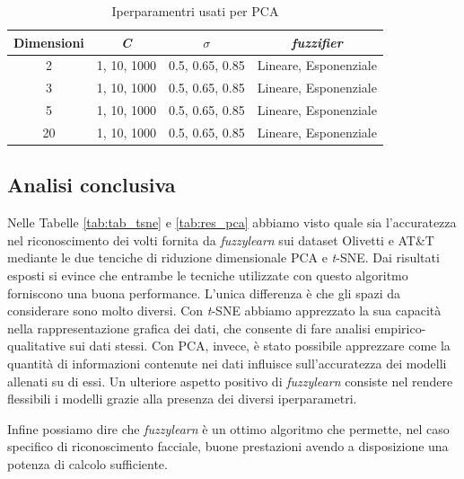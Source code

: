 \documentclass[12pt,italian]{report}
\begin{document}
\begin{table}[h!]
	\begin{center}
		\begin{tabular}{c|c|c|c}
			\toprule
			Dimensioni & \emph{C}           & $ \sigma $       & \emph{fuzzifier}             \\ \midrule
			2 & 1, 10, 1000 & 0.5, 0.65, 0.85 & Lineare, Esponenziale \\ 
			3 & 1, 10, 1000 & 0.5, 0.65, 0.85   & Lineare, Esponenziale \\ 
			5 & 1, 10, 1000 & 0.5, 0.65, 0.85   & Lineare, Esponenziale \\ 
			20 & 1, 10, 1000 & 0.5, 0.65, 0.85   & Lineare, Esponenziale \\ \bottomrule
		\end{tabular}
	\end{center}
	\caption{Iperparamentri usati per PCA}
	\label{tab:hyperparams_pca}
\end{table}

\subsection{Analisi conclusiva}
Nelle Tabelle \ref{tab:tab_tsne} e \ref{tab:res_pca} abbiamo visto quale sia l'accuratezza nel riconoscimento dei volti fornita da \emph{fuzzylearn} sui dataset Olivetti e AT\&T mediante le due tenciche di riduzione dimensionale PCA e \emph{t}-SNE. Dai risultati esposti si evince che entrambe le tecniche utilizzate con questo algoritmo forniscono una buona performance. L'unica differenza è che gli spazi da considerare sono molto diversi. Con \emph{t}-SNE abbiamo apprezzato la sua capacità nella rappresentazione grafica dei dati, che consente di fare analisi empirico-qualitative sui dati stessi. Con PCA, invece, è stato possibile apprezzare come la quantità di informazioni contenute nei dati influisce sull'accuratezza dei modelli allenati su di essi. Un ulteriore aspetto positivo di \emph{fuzzylearn} consiste nel rendere flessibili i modelli grazie alla presenza dei diversi iperparametri.

Infine possiamo dire che \emph{fuzzylearn} è un ottimo algoritmo che permette, nel caso specifico di riconoscimento facciale, buone prestazioni avendo a disposizione una potenza di calcolo sufficiente.

\end{document}
